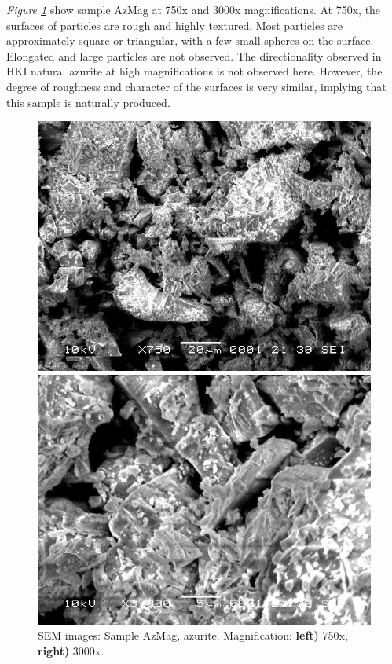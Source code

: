 \textit{Figure \ref{fig:azmag_sem_1}} show sample AzMag at 750x and 3000x magnifications. At 750x, the surfaces of particles are rough and highly textured. Most particles are approximately square or triangular, with a few small spheres on the surface. Elongated and large particles are not observed. The directionality observed in HKI natural azurite at high magnifications is not observed here. However, the degree of roughness and character of the surfaces is very similar, implying that this sample is naturally produced.

\begin{figure}[H]
\centering
\begin{minipage}{.45\textwidth}
  \centering
  \includegraphics[width=\linewidth]{AzMag_x750_1_160321}
\end{minipage}
\begin{minipage}{.45\textwidth}
  \centering
  \includegraphics[width=\linewidth]{AzMag_x3000_1_160321}
\end{minipage}
\caption[SEM images: Sample AzMag, azurite]{SEM images: Sample AzMag, azurite. Magnification: \textbf{left)} 750x, \textbf{right)} 3000x.}
\label{fig:azmag_sem_1}
\end{figure}


